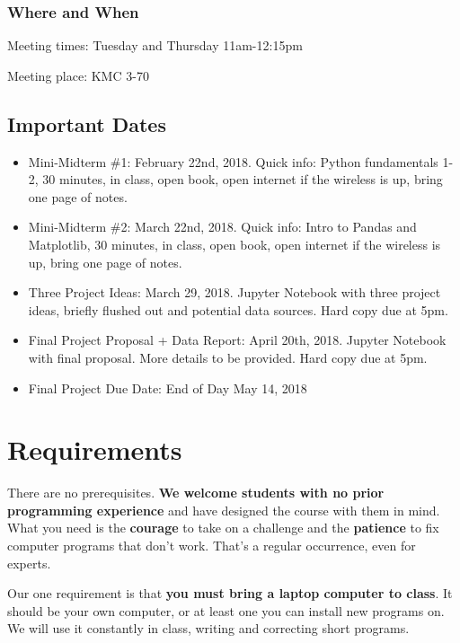 \subsubsection*{Where and When}
Meeting times: Tuesday and Thursday 11am-12:15pm

Meeting place: KMC 3-70

\subsection*{Important Dates}

\begin{itemize}

\item Mini-Midterm \#1: February 22nd, 2018. Quick info: Python fundamentals 1-2, 30 minutes, in class, open book, open internet if the wireless is up, bring one page of notes.

\item Mini-Midterm \#2: March 22nd, 2018. Quick info: Intro to Pandas and Matplotlib, 30 minutes, in class, open book, open internet if the wireless is up, bring one page of notes.

\item Three Project Ideas: March 29, 2018. Jupyter Notebook with three project ideas, briefly flushed out and potential data sources. Hard copy due at 5pm.

\item Final Project Proposal + Data Report: April 20th, 2018. Jupyter Notebook with final proposal. More details to be provided. Hard copy due at 5pm.

\item Final Project Due Date: End of Day May 14, 2018

\end{itemize}

\section*{Requirements}

There are no prerequisites.
{\bf We welcome students with no prior programming experience\/}
and have designed the course with them in mind.
What you need is the {\bf courage\/} to take on a challenge
and the {\bf patience\/} to fix computer programs that don't work.
That's a regular occurrence, even for experts.

Our one requirement is that {\bf you must bring a laptop computer to class\/}.
It should be your own computer, or at least one you can install new programs on.
We will use it constantly in class, writing and correcting short programs.


